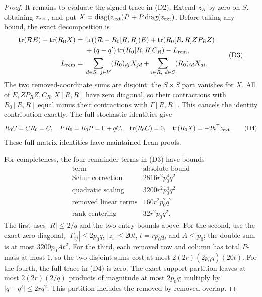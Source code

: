 \begin{proof}
It remains to evaluate the signed trace in (D2).
Extend \(z_R\) by zero on \(S\), obtaining \(z_{\rm ext}\), and put
\(X=\operatorname{diag}(z_{\rm ext})P+P\operatorname{diag}(z_{\rm ext})\).
Before taking any bound, the exact decomposition is
\[
 \begin{split}
 \operatorname{tr}({\cal R}E)-\operatorname{tr}(R_0X)
 ={}&\operatorname{tr}(({\cal R}-R_0[R,R])E)
       +\operatorname{tr}(R_0[R,R]ZP_RZ)\\
    &+(q-q')\operatorname{tr}(R_0[R,R]C_R)-L_{\rm rem},\\
 L_{\rm rem}
 ={}&\sum_{d\in S,\ j\in V}(R_0)_{dj}X_{jd}
       +\sum_{i\in R,\ d\in S}(R_0)_{id}X_{di}.
 \end{split}                                                   \tag{D3}
\]
The two removed-coordinate sums are disjoint; the \(S\times S\)
part vanishes for \(X\). All of \(E,ZP_RZ,C_R,X[R,R]\)
have zero diagonal, so their contractions with \(R_0[R,R]\)
equal minus their contractions with \(\Gamma[R,R]\).
This cancels the identity contribution exactly.
The full stochastic identities give
\[
 R_0C=CR_0=C,\quad
 PR_0=R_0P=\Gamma+qC,\quad
 \operatorname{tr}(R_0C)=0,\quad
 \operatorname{tr}(R_0X)=-2h^\top z_{\rm ext}.                \tag{D4}
\]
These full-matrix identities have maintained Lean proofs.

For completeness, the four remainder terms in (D3) have bounds
\[
 \begin{array}{c|c}
 \text{term}&\text{absolute bound}\\ \hline
 \text{Schur correction}&2816r^2p_0^4q^2\\
 \text{quadratic scaling}&3200r^2p_0^4q^2\\
 \text{removed linear terms}&160r^2p_0^2q^2\\
 \text{rank centering}&32r^2p_0q^2 .
 \end{array}                                                     \tag{D5}
\]
The first uses \(|R|\leq2/q\) and the two entry bounds above.
For the second, use the exact zero diagonal,
\(|\Gamma_{ij}|\leq2p_0q\),
\(|z_i|\leq20t\), \(t=rp_0q\), and \(A\leq p_0\);
the double sum is at most \(3200p_0At^2\).
For the third, each removed row and column has total \(P\)-mass
at most \(1\), so the two disjoint sums cost at most
\(2(2r)(2p_0q)(20t)\).
For the fourth, the full trace in (D4) is zero.
The exact support partition leaves at most \(2(2r)(2/q)\)
products of magnitude at most \(2p_0q\); multiply by
\(|q-q'|\leq2rq^2\).
This partition includes the removed-by-removed overlap.


\end{proof}
